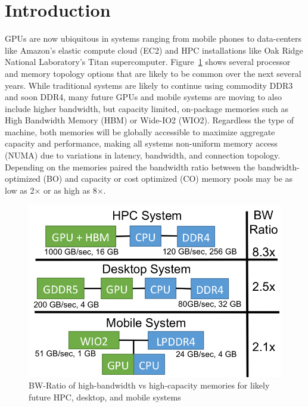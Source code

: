 \section{Introduction}
GPUs are now ubiquitous in systems ranging from mobile phones to data-centers like 
Amazon's elastic compute cloud (EC2) and HPC installations like Oak Ridge 
National Laboratory's Titan supercomputer.
Figure~\ref{fig:arch-asplos2015} shows several processor and memory topology options that
are likely to be common over the next several years. While traditional systems
are likely to continue using commodity DDR3 and soon DDR4, many future GPUs and
mobile systems are moving to also include higher bandwidth, but capacity
limited, on-package memories such as High Bandwidth Memory (HBM) or Wide-IO2
(WIO2)\@. Regardless the type of machine, both memories will be globally
accessible to maximize aggregate capacity and performance, making all systems
non-uniform memory access (NUMA) due to variations in latency, bandwidth, and
connection topology. Depending on the memories paired the bandwidth ratio
between the bandwidth-optimized (BO) and capacity or cost optimized (CO) memory
pools may be as low as 2$\times$ or as high as 8$\times$.

\begin{figure}[t]
    \centering
    \includegraphics[width=0.8\columnwidth]{asplos2015/figures/arch}
    \caption{BW-Ratio of high-bandwidth vs high-capacity memories for likely future HPC, desktop, and mobile systems}
    \label{fig:arch-asplos2015}
\end{figure}


